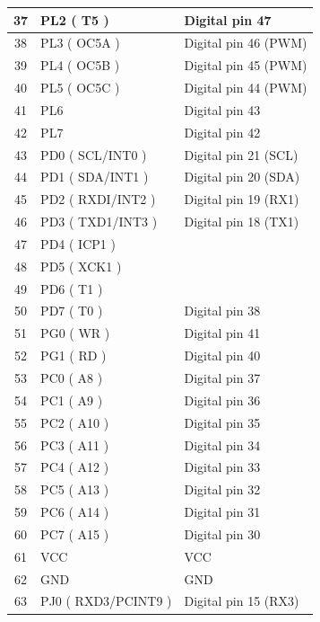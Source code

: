 \begin{appendix}
\begin{table}[h]
\begin{tabular}{|c|p{15.855em}|p{11.43em}|}
    \hline
    37    & PL2 ( T5 ) & Digital pin 47 \\
    \hline
    38    & PL3 ( OC5A ) & Digital pin 46 (PWM) \\
    \hline
    39    & PL4 ( OC5B ) & Digital pin 45 (PWM) \\
    \hline
    40    & PL5 ( OC5C ) & Digital pin 44 (PWM) \\
    \hline
    41    & PL6   & Digital pin 43 \\
    \hline
    42    & PL7   & Digital pin 42 \\
    \hline
    43    & PD0 ( SCL/INT0 ) & Digital pin 21 (SCL) \\
    \hline
    44    & PD1 ( SDA/INT1 ) & Digital pin 20 (SDA) \\
    \hline
    45    & PD2 ( RXDI/INT2 ) & Digital pin 19 (RX1) \\
    \hline
    46    & PD3 ( TXD1/INT3 ) & Digital pin 18 (TX1) \\
    \hline
    47    & PD4 ( ICP1 ) & \multicolumn{1}{l|}{} \\
    \hline
    48    & PD5 ( XCK1 ) & \multicolumn{1}{l|}{} \\
    \hline
    49    & PD6 ( T1 ) & \multicolumn{1}{l|}{} \\
    \hline
    50    & PD7 ( T0 ) & Digital pin 38 \\
    \hline
    51    & PG0 ( WR ) & Digital pin 41 \\
    \hline
    52    & PG1 ( RD ) & Digital pin 40 \\
    \hline
    53    & PC0 ( A8 ) & Digital pin 37 \\
    \hline
    54    & PC1 ( A9 ) & Digital pin 36 \\
    \hline
    55    & PC2 ( A10 ) & Digital pin 35 \\
    \hline
    56    & PC3 ( A11 ) & Digital pin 34 \\
    \hline
    57    & PC4 ( A12 ) & Digital pin 33 \\
    \hline
    58    & PC5 ( A13 ) & Digital pin 32 \\
    \hline
    59    & PC6 ( A14 ) & Digital pin 31 \\
    \hline
    60    & PC7 ( A15 ) & Digital pin 30 \\
    \hline
    61    & VCC   & VCC \\
    \hline
    62    & GND   & GND \\
    \hline
    63    & PJ0 ( RXD3/PCINT9 ) & Digital pin 15 (RX3) \\

\end{tabular}
\end{table}
\end{appendix}
